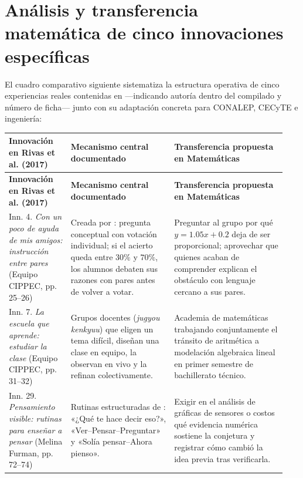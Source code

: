\documentclass[spanish,letterpaper,oneside]{article}
\begin{document}
\section{Análisis y transferencia matemática de cinco innovaciones específicas}
El cuadro comparativo siguiente sistematiza la estructura operativa de cinco experiencias reales contenidas en \citet{rivas2017innovaciones} —indicando autoría dentro del compilado y número de ficha— junto con su adaptación concreta para CONALEP, CECyTE e ingeniería:

{\small{}\renewcommand{\arraystretch}{1.28}
\begin{longtable}{|>{\raggedright\arraybackslash}p{0.21\linewidth}|>{\raggedright\arraybackslash}p{0.35\linewidth}|>{\raggedright\arraybackslash}p{0.38\linewidth}|}\hline
\rowcolor{iiiepePale} \textbf{Innovación en Rivas et al. (2017)} & \textbf{Mecanismo central documentado} & \textbf{Transferencia propuesta en Matemáticas} \\\hline
\endfirsthead
\hline
\rowcolor{iiiepePale} \textbf{Innovación en Rivas et al. (2017)} & \textbf{Mecanismo central documentado} & \textbf{Transferencia propuesta en Matemáticas} \\\hline
\endhead
Inn. 4. \textit{Con un poco de ayuda de mis amigos: instrucción entre pares} (Equipo CIPPEC, pp. 25--26) & Creada por \citet{mazur1997peer}: pregunta conceptual con votación individual; si el acierto queda entre $30\%$ y $70\%$, los alumnos debaten sus razones con pares antes de volver a votar. & Preguntar al grupo por qué $y = 1.05x + 0.2$ deja de ser proporcional; aprovechar que quienes acaban de comprender explican el obstáculo con lenguaje cercano a sus pares. \\\hline
Inn. 7. \textit{La escuela que aprende: estudiar la clase} (Equipo CIPPEC, pp. 31--32) & Grupos docentes (\textit{jugyou kenkyuu}) que eligen un tema difícil, diseñan una clase en equipo, la observan en vivo y la refinan colectivamente. & Academia de matemáticas trabajando conjuntamente el tránsito de aritmética a modelación algebraica lineal en primer semestre de bachillerato técnico. \\\hline
Inn. 29. \textit{Pensamiento visible: rutinas para enseñar a pensar} (Melina Furman, pp. 72--74) & Rutinas estructuradas de \citet{ritchhart2014hacer}: «¿Qué te hace decir eso?», «Ver--Pensar--Preguntar» y «Solía pensar--Ahora pienso». & Exigir en el análisis de gráficas de sensores o costos qué evidencia numérica sostiene la conjetura y registrar cómo cambió la idea previa tras verificarla. \\\hline

\end{longtable}}
\end{document}
